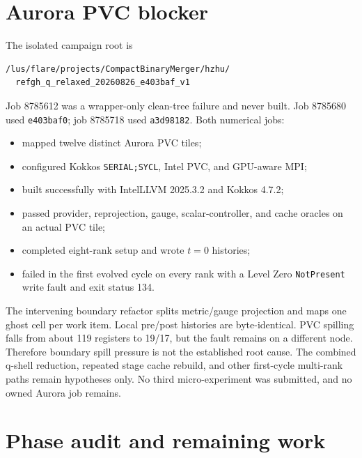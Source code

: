 \documentclass[10pt]{article}
\newcommand{\code}[1]{\texttt{#1}}
\begin{document}
\section{Aurora PVC blocker}

The isolated campaign root is
\begin{lstlisting}
/lus/flare/projects/CompactBinaryMerger/hzhu/
  refgh_q_relaxed_20260826_e403baf_v1
\end{lstlisting}
Job 8785612 was a wrapper-only clean-tree failure and never built.  Job 8785680
used \code{e403baf0}; job 8785718 used \code{a3d98182}.  Both numerical jobs:
\begin{itemize}
\item mapped twelve distinct Aurora PVC tiles;
\item configured Kokkos \code{SERIAL;SYCL}, Intel PVC, and GPU-aware MPI;
\item built successfully with IntelLLVM 2025.3.2 and Kokkos 4.7.2;
\item passed provider, reprojection, gauge, scalar-controller, and cache oracles
      on an actual PVC tile;
\item completed eight-rank setup and wrote $t=0$ histories;
\item failed in the first evolved cycle on every rank with a Level Zero
      \code{NotPresent} write fault and exit status 134.
\end{itemize}

The intervening boundary refactor splits metric/gauge projection and maps one
ghost cell per work item.  Local pre/post histories are byte-identical.  PVC
spilling falls from about 119 registers to 19/17, but the fault remains on a
different node.  Therefore boundary spill pressure is not the established root
cause.  The combined q-shell reduction, repeated stage cache rebuild, and other
first-cycle multi-rank paths remain hypotheses only.  No third micro-experiment
was submitted, and no owned Aurora job remains.

\section{Phase audit and remaining work}
\end{document}
